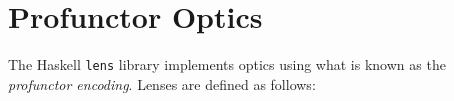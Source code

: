 \documentclass[11pt,a4paper]{article}
\theoremstyle{plain}
\theoremstyle{definition}
\newcommand{\id}{\mathrm{id}}
\newcommand{\todo}[1]{\textcolor{red}{\small #1}}
\begin{document}

\section{Profunctor Optics}
The Haskell \texttt{lens} library implements optics using what is known as the \emph{profunctor encoding}. Lenses are defined as follows:
\end{document}

